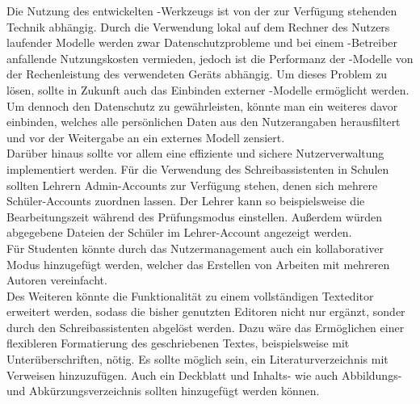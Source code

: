 \documentclass[../main.tex]{subfiles}
\begin{document}
Die Nutzung des entwickelten -Werkzeugs ist von der zur Verfügung stehenden Technik abhängig. Durch die Verwendung lokal auf dem Rechner des Nutzers laufender Modelle werden zwar 
Datenschutzprobleme und bei einem -Betreiber anfallende Nutzungskosten vermieden, jedoch ist die Performanz der -Modelle von der Rechenleistung des verwendeten Geräts abhängig. 
Um dieses Problem zu lösen, sollte in Zukunft auch das Einbinden externer -Modelle ermöglicht werden. Um dennoch den Datenschutz zu gewährleisten, könnte man ein weiteres 
davor einbinden, welches alle persönlichen Daten aus den Nutzerangaben herausfiltert und vor der Weitergabe an ein externes Modell zensiert.\\ 
Darüber hinaus sollte vor allem eine effiziente und sichere Nutzerverwaltung implementiert werden. Für die Verwendung des Schreibassistenten in Schulen sollten Lehrern Admin-Accounts 
zur Verfügung stehen, denen sich mehrere Schüler-Accounts zuordnen lassen. Der Lehrer kann so beispielsweise die Bearbeitungszeit während des Prüfungsmodus einstellen. Außerdem 
würden abgegebene Dateien der Schüler im Lehrer-Account angezeigt werden.\\
Für Studenten könnte durch das Nutzermanagement auch ein kollaborativer Modus hinzugefügt werden, welcher das Erstellen von Arbeiten mit mehreren Autoren vereinfacht. \\
Des Weiteren könnte die Funktionalität zu einem vollständigen Texteditor erweitert werden, sodass die bisher genutzten Editoren nicht nur ergänzt, sonder durch den Schreibassistenten 
abgelöst werden. Dazu wäre das Ermöglichen einer flexibleren Formatierung des geschriebenen Textes, beispielsweise mit Unterüberschriften, nötig. Es sollte möglich sein, ein 
Literaturverzeichnis mit Verweisen hinzuzufügen. Auch ein Deckblatt und Inhalts- wie auch Abbildungs- und Abkürzungsverzeichnis sollten hinzugefügt werden können.
\end{document}
